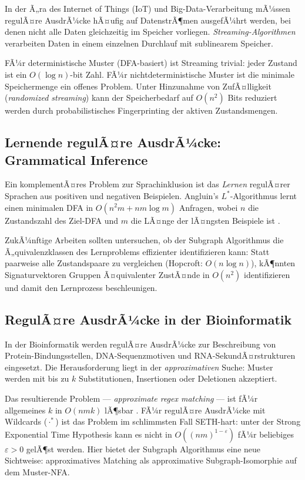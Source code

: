 ﻿\documentclass[a4paper,12pt]{article}
\theoremstyle{definition}
\begin{document}
In der Ã„ra des Internet of Things (IoT) und Big-Data-Verarbeitung mÃ¼ssen regulÃ¤re
AusdrÃ¼cke hÃ¤ufig auf DatenstrÃ¶men ausgefÃ¼hrt werden, bei denen nicht alle Daten
gleichzeitig im Speicher vorliegen. \emph{Streaming-Algorithmen} verarbeiten Daten
in einem einzelnen Durchlauf mit sublinearem Speicher.

FÃ¼r deterministische Muster (DFA-basiert) ist Streaming trivial: jeder Zustand
ist ein $O(\log n)$-bit Zahl. FÃ¼r nichtdeterministische Muster ist die minimale
Speichermenge ein offenes Problem. Unter Hinzunahme von ZufÃ¤lligkeit (\emph{randomized
streaming}) kann der Speicherbedarf auf $O(n^2)$ Bits reduziert werden durch
probabilistisches Fingerprinting der aktiven Zustandsmengen.

\subsection{Lernende regulÃ¤re AusdrÃ¼cke: Grammatical Inference}

Ein komplementÃ¤res Problem zur Sprachinklusion ist das \emph{Lernen} regulÃ¤rer
Sprachen aus positiven und negativen Beispielen. Angluin's $L^*$-Algorithmus
lernt einen minimalen DFA in $O(n^2 m + n m \log m)$ Anfragen, wobei $n$ die
Zustandszahl des Ziel-DFA und $m$ die LÃ¤nge der lÃ¤ngsten Beispiele ist \cite{angluin1987}.

ZukÃ¼nftige Arbeiten sollten untersuchen, ob der Subgraph Algorithmus die
Ã„quivalenzklassen des Lernproblems effizienter identifizieren kann: Statt paarweise
alle Zustandspaare zu vergleichen (Hopcroft: $O(n \log n)$), kÃ¶nnten
Signaturvektoren Gruppen Ã¤quivalenter ZustÃ¤nde in $O(n^2)$ identifizieren
und damit den Lernprozess beschleunigen.

\subsection{RegulÃ¤re AusdrÃ¼cke in der Bioinformatik}

In der Bioinformatik werden regulÃ¤re AusdrÃ¼cke zur Beschreibung von
Protein-Bindungsstellen, DNA-Sequenzmotiven und RNA-SekundÃ¤rstrukturen eingesetzt.
Die Herausforderung liegt in der \emph{approximativen} Suche: Muster werden mit
bis zu $k$ Substitutionen, Insertionen oder Deletionen akzeptiert.

Das resultierende Problem --- \emph{approximate regex matching} --- ist fÃ¼r allgemeines
$k$ in $O(n m k)$ lÃ¶sbar \cite{navarro2001}. FÃ¼r regulÃ¤re AusdrÃ¼cke mit
Wildcards ($\cdot^*$) ist das Problem im schlimmsten Fall SETH-hart: unter der
Strong Exponential Time Hypothesis kann es nicht in $O((nm)^{1-\varepsilon})$
fÃ¼r beliebiges $\varepsilon > 0$ gelÃ¶st werden. Hier bietet der Subgraph
Algorithmus eine neue Sichtweise: approximatives Matching als approximative
Subgraph-Isomorphie auf dem Muster-NFA.
\end{document}
